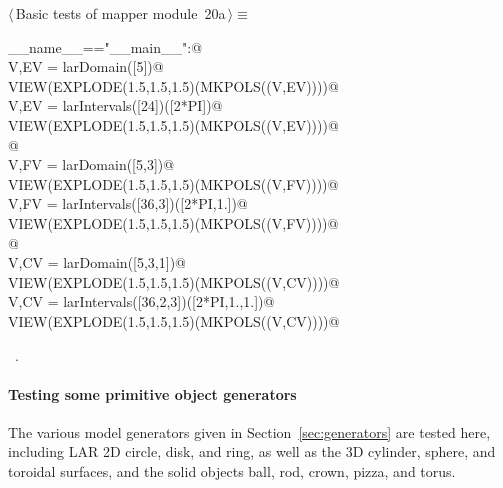 \documentclass[11pt,oneside]{article}	%
\begin{document}
\begin{flushleft} \small \label{scrap37}
\protect{}$\langle\,$Basic tests of mapper module\nobreak\ {\footnotesize 20a}$\,\rangle\equiv$
\vspace{-1ex}
\begin{list}{}{} \item
\mbox{}\verb@if __name__=="__main__":@\\
\mbox{}\verb@   V,EV = larDomain([5])@\\
\mbox{}\verb@   VIEW(EXPLODE(1.5,1.5,1.5)(MKPOLS((V,EV))))@\\
\mbox{}\verb@   V,EV = larIntervals([24])([2*PI])@\\
\mbox{}\verb@   VIEW(EXPLODE(1.5,1.5,1.5)(MKPOLS((V,EV))))@\\
\mbox{}\verb@      @\\
\mbox{}\verb@   V,FV = larDomain([5,3])@\\
\mbox{}\verb@   VIEW(EXPLODE(1.5,1.5,1.5)(MKPOLS((V,FV))))@\\
\mbox{}\verb@   V,FV = larIntervals([36,3])([2*PI,1.])@\\
\mbox{}\verb@   VIEW(EXPLODE(1.5,1.5,1.5)(MKPOLS((V,FV))))@\\
\mbox{}\verb@      @\\
\mbox{}\verb@   V,CV = larDomain([5,3,1])@\\
\mbox{}\verb@   VIEW(EXPLODE(1.5,1.5,1.5)(MKPOLS((V,CV))))@\\
\mbox{}\verb@   V,CV = larIntervals([36,2,3])([2*PI,1.,1.])@\\
\mbox{}\verb@   VIEW(EXPLODE(1.5,1.5,1.5)(MKPOLS((V,CV))))@\\
\mbox{}\verb@@{\NWsep}
\end{list}
\vspace{-1ex}
\footnotesize\addtolength{\baselineskip}{-1ex}
\begin{list}{}{\setlength{\itemsep}{-\parsep}\setlength{\itemindent}{-\leftmargin}}
\item \NWtxtMacroRefIn\ .
\end{list}
\end{flushleft}

\paragraph{Testing some primitive object generators}
The various model generators given in Section~\ref{sec:generators} are tested here, including LAR 2D circle, disk, and ring, as well as the 3D cylinder, sphere, and toroidal surfaces, and the solid objects ball, rod, crown, pizza, and torus.
\end{document}
